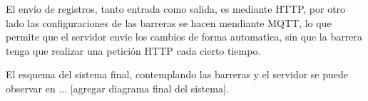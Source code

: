 El envío de registros, tanto entrada como salida, es mediante HTTP, por otro lado las configuraciones de las barreras se hacen mendiante MQTT, lo que permite que el servidor envie los cambios de forma automatica, sin que la barrera tenga que realizar una petición HTTP cada cierto tiempo.

El esquema del sistema final, contemplando las barreras y el servidor se puede observar en ... [agregar diagrama final del sistema].
